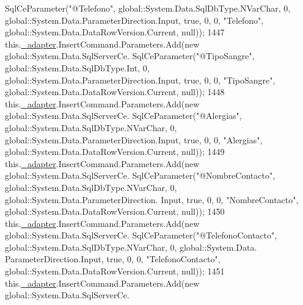 \begin{DoxyCode}
      SqlCeParameter(\textcolor{stringliteral}{"@Telefono"}, global::System.Data.SqlDbType.NVarChar, 0, global::System.Data.ParameterDirection.Input,
       \textcolor{keyword}{true}, 0, 0, \textcolor{stringliteral}{"Telefono"}, global::System.Data.DataRowVersion.Current, null));
1447             this.\hyperlink{class_proyecto___integrador__3_1_1ds_usuarios_table_adapters_1_1_usuarios_table_adapter_ab48b9b83ce2db01dbbc83ad45b428a80}{\_adapter}.InsertCommand.Parameters.Add(\textcolor{keyword}{new} global::System.Data.SqlServerCe.
      SqlCeParameter(\textcolor{stringliteral}{"@TipoSangre"}, global::System.Data.SqlDbType.Int, 0, global::System.Data.ParameterDirection.Input, \textcolor{keyword}{
      true}, 0, 0, \textcolor{stringliteral}{"TipoSangre"}, global::System.Data.DataRowVersion.Current, null));
1448             this.\hyperlink{class_proyecto___integrador__3_1_1ds_usuarios_table_adapters_1_1_usuarios_table_adapter_ab48b9b83ce2db01dbbc83ad45b428a80}{\_adapter}.InsertCommand.Parameters.Add(\textcolor{keyword}{new} global::System.Data.SqlServerCe.
      SqlCeParameter(\textcolor{stringliteral}{"@Alergias"}, global::System.Data.SqlDbType.NVarChar, 0, global::System.Data.ParameterDirection.Input,
       \textcolor{keyword}{true}, 0, 0, \textcolor{stringliteral}{"Alergias"}, global::System.Data.DataRowVersion.Current, null));
1449             this.\hyperlink{class_proyecto___integrador__3_1_1ds_usuarios_table_adapters_1_1_usuarios_table_adapter_ab48b9b83ce2db01dbbc83ad45b428a80}{\_adapter}.InsertCommand.Parameters.Add(\textcolor{keyword}{new} global::System.Data.SqlServerCe.
      SqlCeParameter(\textcolor{stringliteral}{"@NombreContacto"}, global::System.Data.SqlDbType.NVarChar, 0, global::System.Data.ParameterDirection.
      Input, \textcolor{keyword}{true}, 0, 0, \textcolor{stringliteral}{"NombreContacto"}, global::System.Data.DataRowVersion.Current, null));
1450             this.\hyperlink{class_proyecto___integrador__3_1_1ds_usuarios_table_adapters_1_1_usuarios_table_adapter_ab48b9b83ce2db01dbbc83ad45b428a80}{\_adapter}.InsertCommand.Parameters.Add(\textcolor{keyword}{new} global::System.Data.SqlServerCe.
      SqlCeParameter(\textcolor{stringliteral}{"@TelefonoContacto"}, global::System.Data.SqlDbType.NVarChar, 0, global::System.Data.
      ParameterDirection.Input, \textcolor{keyword}{true}, 0, 0, \textcolor{stringliteral}{"TelefonoContacto"}, global::System.Data.DataRowVersion.Current, null));
1451             this.\hyperlink{class_proyecto___integrador__3_1_1ds_usuarios_table_adapters_1_1_usuarios_table_adapter_ab48b9b83ce2db01dbbc83ad45b428a80}{\_adapter}.InsertCommand.Parameters.Add(\textcolor{keyword}{new} global::System.Data.SqlServerCe.

\end{DoxyCode}
